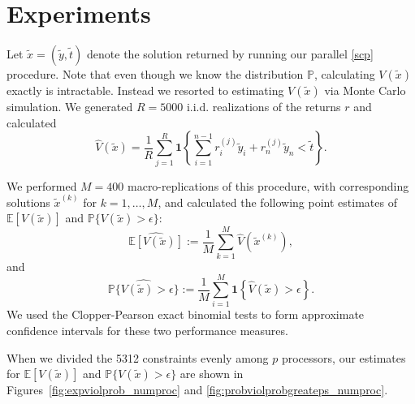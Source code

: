 \documentclass[12pt]{article}
\begin{document}
\section*{Experiments}
Let $\tilde{x} = (\tilde{y}, \tilde{t})$ denote the solution returned by running our parallel \ref{scp} procedure.
Note that even though we know the distribution $\mathbb{P}$, calculating $V(\tilde{x})$ exactly is intractable.
Instead we resorted to estimating $V(\tilde{x})$ via Monte Carlo simulation.
We generated $R = 5000$ i.i.d. realizations of the returns $r$ and calculated
\[ \hat{V}(\tilde{x}) = \frac{1}{R} \sum_{j = 1}^R \mathbf{1}\left\{ \sum_{i=1}^{n-1} r_i^{(j)} \tilde{y}_i + r_n^{(j)} \tilde{y}_n < \tilde{t}\right\}. \]

We performed $M = 400$ macro-replications of this procedure, with corresponding solutions $\tilde{x}^{(k)}$ for $k = 1, \ldots, M$, and calculated the following point estimates of $\mathbb{E}[V(\tilde{x})]$ and $\mathbb{P}\{V(\tilde{x}) > \epsilon\}$:
\[ \widehat{\mathbb{E}[V(\tilde{x})]} := \frac{1}{M} \sum_{k=1}^M \hat{V}(\tilde{x}^{(k)}), \]
and
\[ \widehat{\mathbb{P}\{V(\tilde{x}) > \epsilon\}} := \frac{1}{M} \sum_{i=1}^M \mathbf{1}\left\{\hat{V}(\tilde{x}) > \epsilon\right\}. \]
We used the Clopper-Pearson exact binomial tests to form approximate confidence intervals for these two performance measures.

When we divided the 5312 constraints evenly among $p$ processors, our estimates for $\mathbb{E}[V(\tilde{x})]$ and $\mathbb{P}\{V(\tilde{x}) > \epsilon\}$ are shown in Figures~\ref{fig:expviolprob_numproc} and \ref{fig:probviolprobgreateps_numproc}.

%
\end{document}
